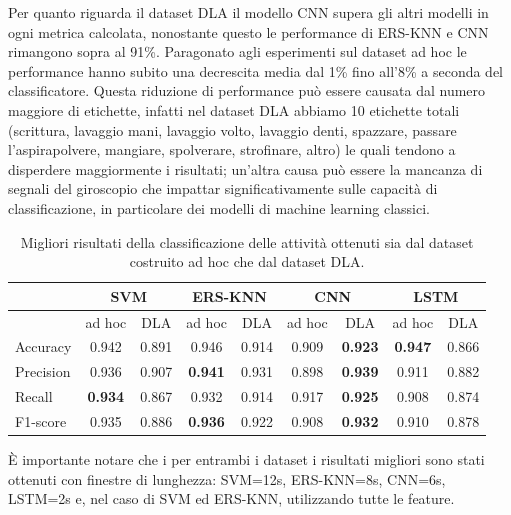Per quanto riguarda il dataset DLA il modello CNN supera gli altri modelli in ogni metrica calcolata, nonostante questo le performance di ERS-KNN e CNN rimangono sopra al 91\%. Paragonato agli esperimenti sul dataset ad hoc le performance hanno subito una decrescita media dal 1\% fino all'8\% a seconda del classificatore. Questa riduzione di performance può essere causata dal numero maggiore di etichette, infatti nel dataset DLA abbiamo 10 etichette totali (scrittura, lavaggio mani, lavaggio volto, lavaggio denti, spazzare, passare l'aspirapolvere, mangiare, spolverare, strofinare, altro) le quali tendono a disperdere maggiormente i risultati; un'altra causa può essere la mancanza di segnali del giroscopio che impattar significativamente sulle capacità di classificazione, in particolare dei modelli di machine learning classici.

\begin{table}
    \centering
    \begin{tabular}{l | c c | c c | c c | c c }
        \hline
        & \multicolumn{2}{c}{SVM} & \multicolumn{2}{c}{ERS-KNN} & \multicolumn{2}{c}{CNN} & \multicolumn{2}{c}{LSTM} \\
        \hline 
        & ad hoc & DLA & ad hoc & DLA & ad hoc & DLA & ad hoc & DLA \\
        Accuracy & 0.942 & 0.891 & 0.946 & 0.914 & 0.909 & \textbf{0.923} & \textbf{0.947} & 0.866 \\
        Precision & 0.936 & 0.907 & \textbf{0.941} & 0.931 & 0.898 & \textbf{0.939} & 0.911 & 0.882 \\
        Recall & \textbf{0.934} & 0.867 & 0.932 & 0.914 & 0.917 & \textbf{0.925} & 0.908 & 0.874 \\
        F1-score& 0.935 & 0.886 & \textbf{0.936} & 0.922 & 0.908 & \textbf{0.932} & 0.910 & 0.878\\
        \hline
    \end{tabular}
    \caption{Migliori risultati della classificazione delle attività ottenuti sia dal dataset costruito ad hoc che dal dataset DLA.}
    \label{tab:activity-classification}
\end{table}

\`E importante notare che i per entrambi i dataset i risultati migliori sono stati ottenuti con finestre di lunghezza: SVM=12s, ERS-KNN=8s, CNN=6s, LSTM=2s e, nel caso di SVM ed ERS-KNN, utilizzando tutte le feature.

